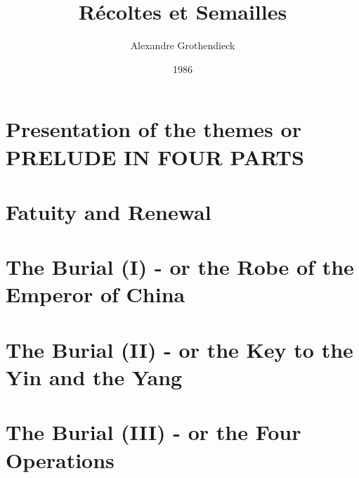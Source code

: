 \documentclass{book}
\begin{document}
\title{R\'ecoltes et Semailles}
\author{Alexandre Grothendieck}
\date{1986}
\maketitle
\tableofcontents


\part*{Presentation of the themes or PRELUDE IN FOUR PARTS}




% 


% 

\part{Fatuity and Renewal}
\label{part:1}

% 
% 
% 
% 
% 
% 
% 
% 

\part{The Burial (I) - or the Robe of the Emperor of China}
\label{part:2}




% 

\part{The Burial (II) - or the Key to the Yin and the Yang}
\label{part:3}


% 

\part{The Burial (III) - or the Four Operations}
\label{part:4}


\end{document}

